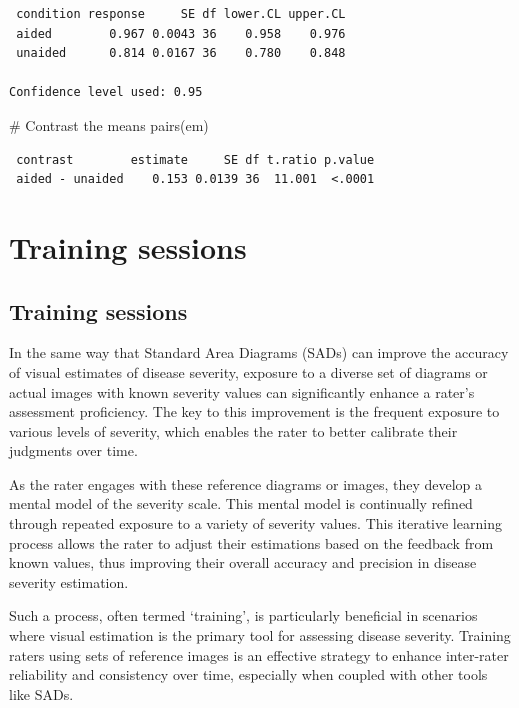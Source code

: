 \documentclass[
  letterpaper,
]{book}
\newenvironment{Shaded}{\begin{snugshade}}{\end{snugshade}}
\newcommand{\CommentTok}[1]{\textcolor[rgb]{0.37,0.37,0.37}{#1}}
\newcommand{\FunctionTok}[1]{\textcolor[rgb]{0.28,0.35,0.67}{#1}}
\newcommand{\NormalTok}[1]{\textcolor[rgb]{0.00,0.23,0.31}{#1}}
\begin{document}
\begin{verbatim}
 condition response     SE df lower.CL upper.CL
 aided        0.967 0.0043 36    0.958    0.976
 unaided      0.814 0.0167 36    0.780    0.848

Confidence level used: 0.95 
\end{verbatim}

\begin{Shaded}
\begin{Highlighting}[]
\CommentTok{\# Contrast the means}
\FunctionTok{pairs}\NormalTok{(em)}
\end{Highlighting}
\end{Shaded}

\begin{verbatim}
 contrast        estimate     SE df t.ratio p.value
 aided - unaided    0.153 0.0139 36  11.001  <.0001
\end{verbatim}

\hypertarget{training-sessions}{%
\chapter{Training sessions}\label{training-sessions}}

\hypertarget{training-sessions-1}{%
\section{Training sessions}\label{training-sessions-1}}

In the same way that Standard Area Diagrams (SADs) can improve the
accuracy of visual estimates of disease severity, exposure to a diverse
set of diagrams or actual images with known severity values can
significantly enhance a rater's assessment proficiency. The key to this
improvement is the frequent exposure to various levels of severity,
which enables the rater to better calibrate their judgments over time.

As the rater engages with these reference diagrams or images, they
develop a mental model of the severity scale. This mental model is
continually refined through repeated exposure to a variety of severity
values. This iterative learning process allows the rater to adjust their
estimations based on the feedback from known values, thus improving
their overall accuracy and precision in disease severity estimation.

Such a process, often termed `training', is particularly beneficial in
scenarios where visual estimation is the primary tool for assessing
disease severity. Training raters using sets of reference images is an
effective strategy to enhance inter-rater reliability and consistency
over time, especially when coupled with other tools like SADs.
\end{document}
